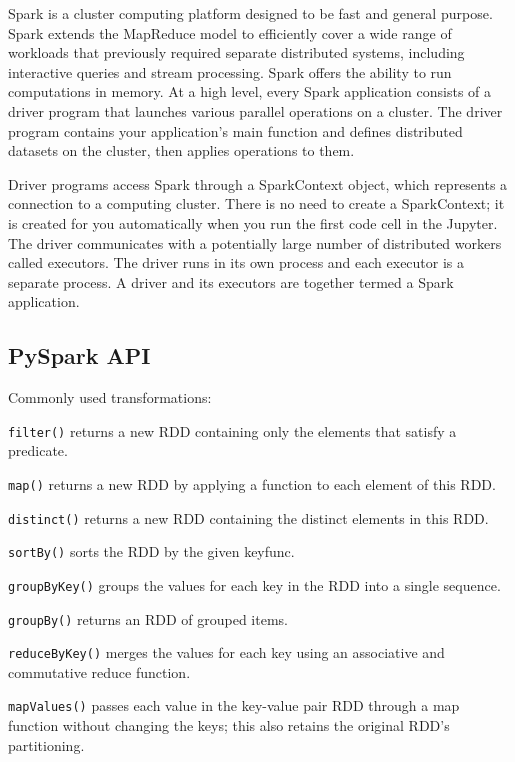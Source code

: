 \documentclass[11pt,oneside,a4paper]{article}
\begin{document}
Spark is a cluster computing platform designed to be fast and general purpose. Spark extends the MapReduce model to efficiently cover a wide range of workloads that previously required separate distributed systems, including interactive queries and stream processing. Spark offers the ability to run computations in memory.
At a high level, every Spark application consists of a driver program that launches various parallel operations on a cluster. The driver program contains your application's main function and defines distributed datasets on the cluster, then applies operations to them.

Driver programs access Spark through a SparkContext object, which represents a connection to a computing cluster. There is no need to create a SparkContext; it is created for you automatically when you run the first code cell in the Jupyter. The driver communicates with a potentially large number of distributed workers called executors. The driver runs in its own process and each executor is a separate process. A driver and its executors are together termed a Spark application.


\subsection{PySpark API}

Commonly used transformations:

\begin{compactitem}
\item \texttt{filter()} returns a new RDD containing only the elements that satisfy a predicate.
\item \texttt{map()} returns a new RDD by applying a function to each element of this RDD.
\item \texttt{distinct()} returns a new RDD containing the distinct elements in this RDD.
\item \texttt{sortBy()} sorts the RDD by the given keyfunc.
\item \texttt{groupByKey()} groups the values for each key in the RDD into a single sequence.
\item \texttt{groupBy()} returns an RDD of grouped items.
\item \texttt{reduceByKey()} merges the values for each key using an associative and commutative reduce function.
\item \texttt{mapValues()} passes each value in the key-value pair RDD through a map function without changing the keys; this also retains the original RDD’s partitioning.
\end{compactitem}
\end{document}
